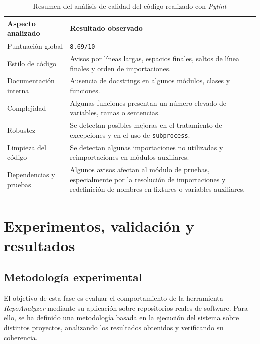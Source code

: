 \documentclass[a4paper, 12pt]{book}
\begin{document}
\begin{table}[H]
\centering
\small
\begin{tabular}{|p{5cm}|p{7.5cm}|}
\hline
\textbf{Aspecto analizado} & \textbf{Resultado observado} \\
\hline
Puntuación global & \texttt{8.69/10} \\
\hline
Estilo de código & Avisos por líneas largas, espacios finales, saltos de línea finales y orden de importaciones. \\
\hline
Documentación interna & Ausencia de docstrings en algunos módulos, clases y funciones. \\
\hline
Complejidad & Algunas funciones presentan un número elevado de variables, ramas o sentencias. \\
\hline
Robustez & Se detectan posibles mejoras en el tratamiento de excepciones y en el uso de \texttt{subprocess}. \\
\hline
Limpieza del código & Se detectan algunas importaciones no utilizadas y reimportaciones en módulos auxiliares. \\
\hline
Dependencias y pruebas & Algunos avisos afectan al módulo de pruebas, especialmente por la resolución de importaciones y redefinición de nombres en fixtures o variables auxiliares. \\
\hline
\end{tabular}
\caption{Resumen del análisis de calidad del código realizado con \emph{Pylint}}
\label{tab:pylint}
\end{table}



\cleardoublepage
\chapter{Experimentos, validación y resultados}
\label{chap:experimentos}

\section{Metodología experimental}
\label{sec:metodologia}

El objetivo de esta fase es evaluar el comportamiento de la herramienta \emph{RepoAnalyzer} mediante su aplicación sobre repositorios reales de software. Para ello, se ha definido una metodología basada en la ejecución del sistema sobre distintos proyectos, analizando los resultados obtenidos y verificando su coherencia.
\end{document}
